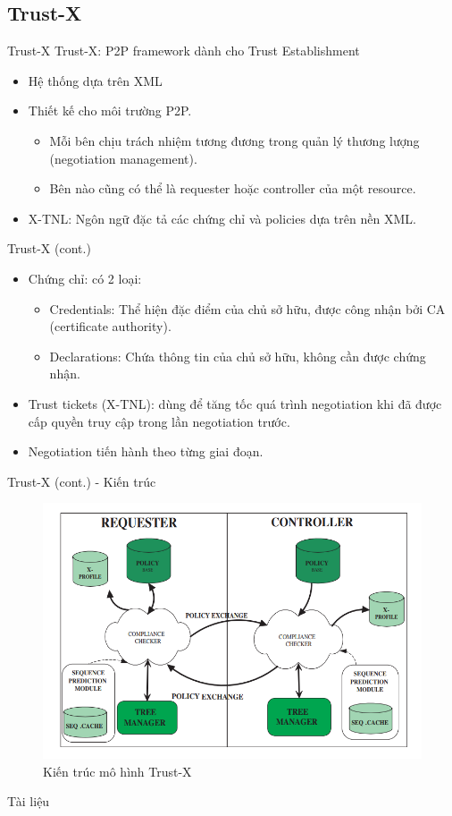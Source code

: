 \documentclass[11pt]{beamer}
\begin{document}
\subsection{Trust-X}
\begin{frame}{Trust-X}
Trust-X: P2P framework dành cho Trust Establishment\cite{10.1109/TKDE.2004.1318565}
\begin{itemize}
\item Hệ thống dựa trên XML
\item Thiết kế cho môi trường P2P.
\begin{itemize}
\item Mỗi bên chịu trách nhiệm tương đương trong quản lý thương lượng (negotiation management).
\item Bên nào cũng có thể là requester hoặc controller của một resource.
\end{itemize}
\item X-TNL: Ngôn ngữ đặc tả các chứng chỉ và policies dựa trên nền XML.
\end{itemize}
\end{frame}

\begin{frame}{Trust-X (cont.)}
\begin{itemize}
\item Chứng chỉ: có 2 loại:
\begin{itemize}
\item Credentials: Thể hiện đặc điểm của chủ sở hữu, được công nhận bởi CA (certificate authority).
\item Declarations: Chứa thông tin của chủ sở hữu, không cần được chứng nhận.
\end{itemize}
\item Trust tickets (X-TNL): dùng để tăng tốc quá trình negotiation khi đã được cấp quyền truy cập trong lần negotiation trước.
\item Negotiation tiến hành theo từng giai đoạn.
\end{itemize}
\end{frame}

\begin{frame}{Trust-X (cont.) - Kiến trúc}
\begin{figure}
\centering
\includegraphics[scale=.5]{img/trust-x-architecture.PNG}
\caption{Kiến trúc mô hình Trust-X}
\label{fig:trust_x_architecture}
\end{figure}
\end{frame}

\begin{frame}[allowframebreaks]{Tài liệu}
\printbibliography
\end{frame}
\end{document}
